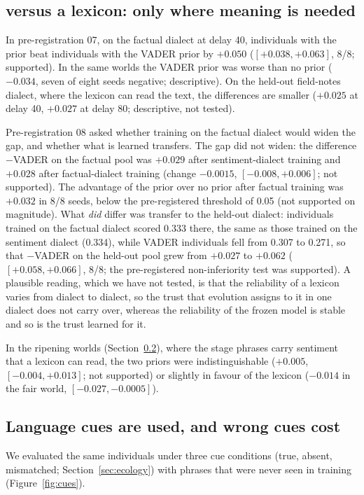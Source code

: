 \subsection{\laya{} versus a lexicon: only where meaning is needed}
\label{sec:res-lexicon}
In pre-registration 07, on the factual dialect at delay 40, individuals with the \laya{} prior beat individuals with the VADER prior by $+0.050$ ($[+0.038,+0.063]$, 8/8; supported). In the same worlds the VADER prior was worse than no prior ($-0.034$, seven of eight seeds negative; descriptive). On the held-out field-notes dialect, where the lexicon can read the text, the differences are smaller ($+0.025$ at delay 40, $+0.027$ at delay 80; descriptive, not tested).

Pre-registration 08 asked whether training on the factual dialect would widen the gap, and whether what is learned transfers. The gap did not widen: the difference \laya{}$-$VADER on the factual pool was $+0.029$ after sentiment-dialect training and $+0.028$ after factual-dialect training (change $-0.0015$, $[-0.008,+0.006]$; not supported). The advantage of the prior over no prior after factual training was $+0.032$ in 8/8 seeds, below the pre-registered threshold of 0.05 (not supported on magnitude). What \emph{did} differ was transfer to the held-out dialect: \laya{} individuals trained on the factual dialect scored 0.333 there, the same as those trained on the sentiment dialect (0.334), while VADER individuals fell from 0.307 to 0.271, so that \laya{}$-$VADER on the held-out pool grew from $+0.027$ to $+0.062$ ($[+0.058,+0.066]$, 8/8; the pre-registered non-inferiority test was supported). A plausible reading, which we have not tested, is that the reliability of a lexicon varies from dialect to dialect, so the trust that evolution assigns to it in one dialect does not carry over, whereas the reliability of the frozen model is stable and so is the trust learned for it.

In the ripening worlds (Section~\ref{sec:res-cues}), where the stage phrases carry sentiment that a lexicon can read, the two priors were indistinguishable ($+0.005$, $[-0.004,+0.013]$; not supported) or slightly in favour of the lexicon ($-0.014$ in the fair world, $[-0.027,-0.0005]$).

\subsection{Language cues are used, and wrong cues cost}
\label{sec:res-cues}
We evaluated the same individuals under three cue conditions (true, absent, mismatched; Section~\ref{sec:ecology}) with phrases that were never seen in training (Figure~\ref{fig:cues}).

